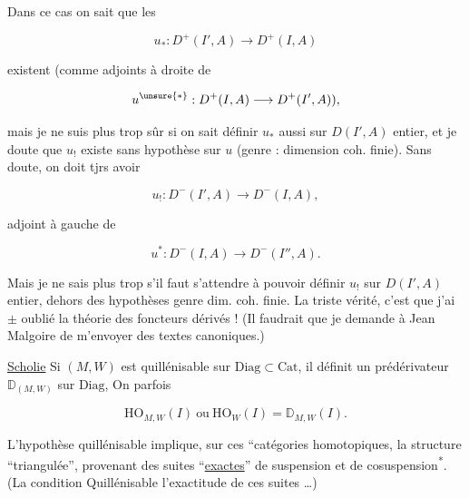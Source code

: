 

Dans ce cas on sait que les 

\[ u_*:D^+(I',A)\longrightarrow D^+(I,A) \]

existent (comme adjoints à droite de

\[ u^{\unsure{*}}:D^+(I,A)\longrightarrow D^+(I',A)), \]

mais je ne suis plus trop sûr si on sait définir $u_*$ aussi sur $D(I',A)$  entier, et je doute que $u_!$ existe sans hypothèse sur $u$ (genre : dimension coh. finie). Sans doute, on doit tjrs avoir

\[ u_!:D^-(I',A)\longrightarrow D^-(I,A), \]

adjoint à gauche de

\[ u^*:D^-(I,A)\longrightarrow D^-(I'',A). \]

Mais je  ne sais plus trop s'il faut s'attendre à pouvoir définir $u_!$ sur $D(I',A)$  entier,   dehors des hypothèses genre dim. coh. finie. La triste vérité, c'est que j'ai $\pm$ oublié la théorie des foncteurs dérivés ! (Il faudrait que je demande  à Jean Malgoire de m'envoyer des textes canoniques.)

\uline{Scholie} Si $(M,W)$ est quillénisable sur  $\mathrm{Diag}\subset\mathrm{Cat}$,  il définit un prédérivateur  $\mathbb{D}_{(M,W)}$ sur $\mathrm{Diag}$,  On  parfois

\[ \mathrm{HO}_{M,W}(I)\ \text{ou}\ \mathrm{HO}_W(I)=\mathbb{D}_{M,W}(I). \]

L'hypothèse quillénisable implique, sur  ces ``catégories homotopiques, la structure   ``triangulée'', provenant des suites ``\uline{exactes}'' de suspension et de cosuspension\textsuperscript{*}. (La condition Quillénisable  l'exactitude de ces suites \ldots)



